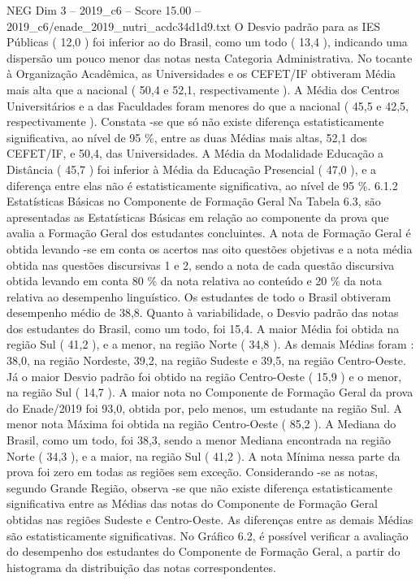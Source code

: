 \begin{textsample}{NEG Dim 3 – 2019\_c6 – Score 15.00 – 2019\_c6/enade\_2019\_nutri\_acdc34d1d9.txt}
O Desvio padrão para as IES Públicas ( 12,0 ) foi inferior ao do Brasil, como um todo ( 13,4 ), indicando uma dispersão um pouco menor das notas nesta Categoria Administrativa.
No tocante à Organização Acadêmica, as Universidades e os CEFET/IF obtiveram Média mais alta que a nacional ( 50,4 e 52,1, respectivamente ).
A Média dos Centros Universitários e a das Faculdades foram menores do que a nacional ( 45,5 e 42,5, respectivamente ).
Constata -se que só não existe diferença estatisticamente significativa, ao nível de 95 \%, entre as duas Médias mais altas, 52,1 dos CEFET/IF, e 50,4, das Universidades.
A Média da Modalidade Educação a Distância ( 45,7 ) foi inferior à Média da Educação Presencial ( 47,0 ), e a diferença entre elas não é estatisticamente significativa, ao nível de 95 \%. 6.1.2 Estatísticas Básicas no Componente de Formação Geral Na Tabela 6.3, são apresentadas as Estatísticas Básicas em relação ao componente da prova que avalia a Formação Geral dos estudantes concluintes.
A nota de Formação Geral é obtida levando -se em conta os acertos nas oito questões objetivas e a nota média obtida nas questões discursivas 1 e 2, sendo a nota de cada questão discursiva obtida levando em conta 80 \% da nota relativa ao conteúdo e 20 \% da nota relativa ao desempenho linguístico.
Os estudantes de todo o Brasil obtiveram desempenho médio de 38,8.
Quanto à variabilidade, o Desvio padrão das notas dos estudantes do Brasil, como um todo, foi 15,4.
A maior Média foi obtida na região Sul ( 41,2 ), e a menor, na região Norte ( 34,8 ).
As demais Médias foram : 38,0, na região Nordeste, 39,2, na região Sudeste e 39,5, na região Centro-Oeste.
Já o maior Desvio padrão foi obtido na região Centro-Oeste ( 15,9 ) e o menor, na região Sul ( 14,7 ).
A maior nota no Componente de Formação Geral da prova do Enade/2019 foi 93,0, obtida por, pelo menos, um estudante na região Sul.
A menor nota Máxima foi obtida na região Centro-Oeste ( 85,2 ).
A Mediana do Brasil, como um todo, foi 38,3, sendo a menor Mediana encontrada na região Norte ( 34,3 ), e a maior, na região Sul ( 41,2 ).
A nota Mínima nessa parte da prova foi zero em todas as regiões sem exceção.
Considerando -se as notas, segundo Grande Região, observa -se que não existe diferença estatisticamente significativa entre as Médias das notas do Componente de Formação Geral obtidas nas regiões Sudeste e Centro-Oeste.
As diferenças entre as demais Médias são estatisticamente significativas.
No Gráfico 6.2, é possível verificar a avaliação do desempenho dos estudantes do Componente de Formação Geral, a partir do histograma da distribuição das notas correspondentes.

\end{textsample}
